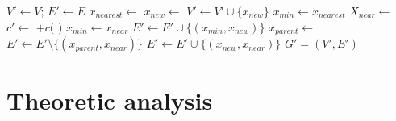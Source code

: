 \documentclass[paper=a4, fontsize=11pt]{scrartcl}
\begin{document}
\begin{algorithm}
\begin{algorithmic}[1]
\State $ V' \leftarrow V $; $ E' \leftarrow E $
\State $ x_{nearest} \leftarrow $ 
\State $ x_{new} \leftarrow $ 
\State $ V' \leftarrow V' \cup \{ x_{new} \} $
\State $ x_{min} \leftarrow x_{nearest} $
\State $ X_{near} \leftarrow $ 
\State $ c' \leftarrow $  $ + c( $  $ ) $ 
\State $ x_{min} \leftarrow x_{near} $
\EndIf
\EndIf
\EndFor
\State $ E' \leftarrow E' \cup \{ ( x_{min}, x_{new} ) \} $
\State $ x_{parent} \leftarrow $ 
\State $ E' \leftarrow E' \setminus \{ ( x_{parent}, x_{near} ) \} $
\State $ E' \leftarrow E' \cup \{ ( x_{new}, x_{near} ) \} $
\EndIf
\EndFor
\EndIf
\Return $ G' = (V', E') $ 
\end{algorithmic}
\label{alg:mo_rrtstar_extend}
\caption{ $ \mbox{Extend}_{MORRT^{*}} (G, x) $}
\end{algorithm}

\section{Theoretic analysis}



\end{document}
